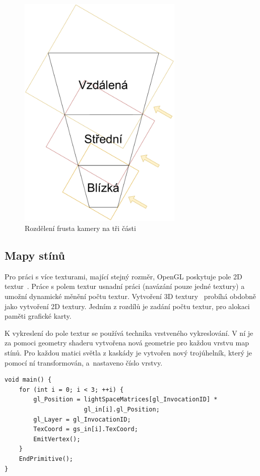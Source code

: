 \documentclass[thesis=M,czech]{FITthesis}[2019/12/23]
\begin{document}
\begin{figure}\centering
	\includegraphics[width=0.7\textwidth]{images/shadows/frustum_div}
	\caption[Rozdělení frusta kamery na tři části]{Rozdělení frusta kamery na tři části}\label{fig:shadows_frustum_div}
\end{figure}

\subsection{Mapy stínů}

Pro práci s více texturami, mající stejný rozměr, OpenGL poskytuje pole 2D textur~\cite{kronos_array_texture}. Práce s polem textur usnadní práci (navázání pouze jedné textury) a umožní dynamické měnění počtu textur. Vytvoření 3D textury~\cite{kronos_3d_texture} probíhá obdobně jako vytvoření 2D textury. Jedním z rozdílů je zadání počtu textur, pro alokaci paměti grafické karty.

K vykreslení do pole textur se používá technika vrstveného vykreslování. V ní je za pomoci geometry shaderu vytvořena nová geometrie pro každou vrstvu map stínů. Pro každou matici světla z kaskády je vytvořen nový trojúhelník, který je pomocí ní transformován, a~nastaveno číslo vrstvy.

\begin{verbatim}
void main() {
    for (int i = 0; i < 3; ++i) {
        gl_Position = lightSpaceMatrices[gl_InvocationID] * 
                      gl_in[i].gl_Position;
        gl_Layer = gl_InvocationID;
        TexCoord = gs_in[i].TexCoord;
        EmitVertex();
    }
    EndPrimitive();
}
\end{verbatim}
\end{document}
